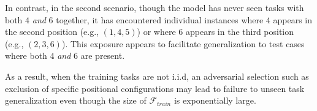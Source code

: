 In contrast, in the second scenario, though the model has never seen tasks with both \( 4 \) \textit{and} \( 6 \) together, it has encountered individual instances where \( 4 \) appears in the second position (e.g., \( (1,4,5) \)) or where \( 6 \) appears in the third position (e.g., \( (2,3,6) \)). This exposure appears to facilitate generalization to test cases where both \( 4 \) \textit{and} \( 6 \) are present. 



\begin{table*}[t!]
    \centering
    \caption{Generalization Results for Scenarios 1 and 2 for $d=10, k=3$.}
    \label{tab:generalization_results}
\end{table*}

As a result, when the training tasks are not i.i.d, an adversarial selection such as exclusion of specific positional configurations may lead to failure to unseen task generalization even though the size of $\mathcal{F}_{train}$ is exponentially large. 







